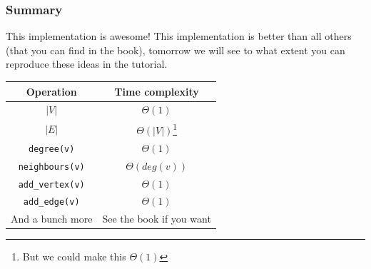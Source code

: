 \begin{frame}
	\frametitle{Summary}

		\begin{block}{This implementation is awesome!}
			This implementation is better than all others (that you can find in the book), tomorrow we will see to what extent you can
			reproduce these ideas in the tutorial.
		\end{block}	

		\pause
		\begin{tabular}{c | c}
		Operation & Time complexity \\
		\midrule
		$|V|$ & $\Theta(1)$ \\
		$|E|$ & $\Theta(|V|)$\footnote{But we could make this $\Theta(1)$} \\
		\pause
		\texttt{degree(v)} & $\Theta(1)$ \\
		\texttt{neighbours(v)} & $\Theta(\mathit{deg}(v))$ \\
		\pause
		\texttt{add\_vertex(v)} & $\Theta(1)$ \\
		\texttt{add\_edge(v)} & $\Theta(1)$ \\
		\pause
		And a bunch more & See the book if you want\\
		\end{tabular}
\end{frame}

